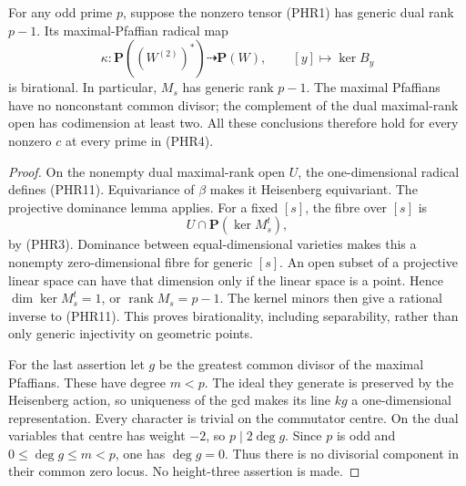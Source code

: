 \begin{theorem}
\label{thm:prime-Heisenberg-birational-radical}
For any odd prime \(p\), suppose the nonzero tensor (PHR1)
has generic dual rank \(p-1\). Its maximal-Pfaffian radical map
\[
       \kappa:\mathbf P((W^{(2)})^*)\dashrightarrow
                    \mathbf P(W),\qquad [y]\longmapsto\ker B_y
                                                        \tag{PHR11}
\]
is birational. In particular, \(M_s\) has generic rank \(p-1\).
The maximal Pfaffians have no nonconstant common divisor; the
complement of the dual maximal-rank open has codimension at least two.
All these conclusions therefore hold for every nonzero \(c\)
at every prime in (PHR4).
\end{theorem}
\begin{proof}
On the nonempty dual maximal-rank open \(U\), the one-dimensional
radical defines (PHR11). Equivariance of \(\beta\) makes it
Heisenberg equivariant. The projective dominance lemma applies.
For a fixed \([s]\), the fibre over \([s]\) is
\[
                        U\cap\mathbf P(\ker M_s^t),
                                                        \tag{PHR12}
\]
by (PHR3). Dominance between equal-dimensional varieties makes
this a nonempty zero-dimensional fibre for generic \([s]\).
An open subset of a projective linear space can have that
dimension only if the linear space is a point. Hence
\(\dim\ker M_s^t=1\), or \(\operatorname{rank}M_s=p-1\).
The kernel minors then give a rational inverse to (PHR11).
This proves birationality, including separability, rather than
only generic injectivity on geometric points.

For the last assertion let \(g\) be the greatest common divisor
of the maximal Pfaffians. These have degree \(m<p\). The ideal
they generate is preserved by the Heisenberg action, so uniqueness
of the gcd makes its line \(kg\) a one-dimensional representation.
Every character is trivial on the commutator centre. On the
dual variables that centre has weight \(-2\), so
\(p\mid 2\deg g\). Since \(p\) is odd and
\(0\le\deg g\le m<p\), one has \(\deg g=0\).
Thus there is no divisorial component in their common zero locus.
No height-three assertion is made.
\end{proof}

